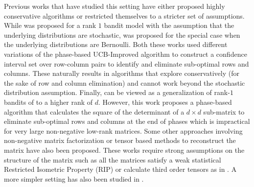 Previous works that have studied this setting have either proposed highly conservative algorithms or restricted themselves to a stricter set of assumptions. While \citet{katariya2016stochastic} was proposed for a rank $1$ bandit model with the assumption that the underlying distributions are stochastic, \citet{katariya2017bernoulli} was proposed for the special case when the underlying distributions are Bernoulli. Both these works used different variations of the phase-based UCB-Improved \citep{auer2010ucb} algorithm to construct a confidence interval set over row-column pairs to identify and eliminate sub-optimal rows and columns. These naturally results in algorithms that explore conservatively (for the sake of row and column elimination) and cannot work beyond the stochastic distribution assumption. Finally, \citet{kveton2017stochastic} can be viewed as a generalization of rank-$1$ bandits of \citet{katariya2016stochastic} to a higher rank of $d$. However, this work proposes a phase-based algorithm that calculates the square of the determinant of a $d\times d$ sub-matrix to eliminate sub-optimal rows and columns at the end of phases which is impractical for very large non-negative low-rank matrices. Some other approaches involving non-negative matrix factorization \citet{sen2016contextual} or tensor based methods \citep{gopalan2016low} to reconstruct the matrix have also been proposed. These works require strong assumptions on the structure of the matrix such as all the matrices satisfy a weak statistical Restricted Isometric Property (RIP) or calculate third order tensors as in \citet{anandkumar2014tensor}. A more simpler setting has also been studied in \citet{maillard2014latent}.


